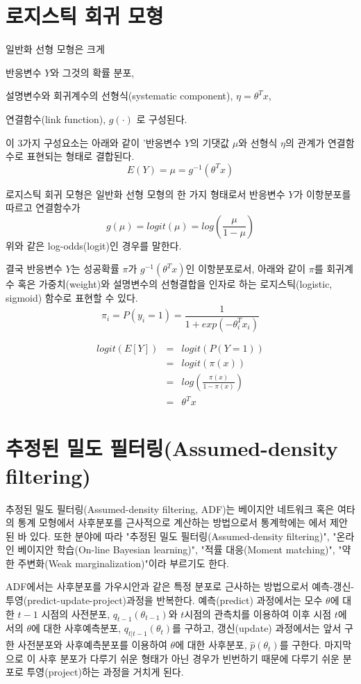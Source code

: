 \documentclass[oneside,b5paper,11pt]{book} %
\begin{document}
\section{로지스틱 회귀 모형}

일반화 선형 모형은 크게 
\begin{inparaenum}[i)]
\item 반응변수 $Y$와 그것의 확률 분포,\quad
\item 설명변수와 회귀계수의 선형식(systematic component), $\eta = \theta^T x$, \quad
\item 연결함수(link function), $g(\cdot)$ 로 구성된다.
\end{inparaenum} 이 3가지 구성요소는 아래와 같이 '반응변수 $Y$의 기댓값 $\mu$와 선형식 $\eta$의 관계가 연결함수로 표현되는 형태로 결합된다.\citep{Agresti1996}
$$E(Y) = \mu = g^{-1}(\theta^T x)$$

 로지스틱 회귀 모형은 일반화 선형 모형의 한 가지 형태로서 반응변수 $Y$가 이항분포를 따르고 연결함수가 
$$
g(\mu) = logit(\mu) =log \left(\frac{\mu}{1-\mu}\right)
$$
위와 같은 log-odds(logit)인 경우를 말한다.

결국 반응변수 $Y$는 성공확률 $\pi$가 $g^{-1}(\theta^T x)$인 이항분포로서, 아래와 같이 $\pi$를 회귀계수 혹은 가중치(weight)와 설명변수의 선형결합을 인자로 하는 로지스틱(logistic, sigmoid) 함수로 표현할 수 있다.
$$
\pi_i = P(y_i=1) = \frac{1}{1+exp(-\theta_i^T x_i)}
$$

\begin{eqnarray}
    {}logit(E[Y])  
  &=& logit(P(Y=1))  \\
  &=& logit(\pi(x))  \\  
  &=& log \left( \frac{\pi(x)}{1-\pi(x)}\right) \\
  &=& \theta^T x
\end{eqnarray}


\section{추정된 밀도 필터링(Assumed-density filtering)}
 추정된 밀도 필터링(Assumed-density filtering, ADF)는 베이지안 네트워크 혹은 여타의 통계 모형에서 사후분포를 근사적으로 계산하는 방법으로서 통계학에는 \citet{Lauritzen1992}에서 제안된 바 있다. 또한 분야에 따라 "추정된 밀도 필터링(Assumed-density filtering)", "온라인 베이지안 학습(On-line Bayesian learning)", "적률 대응(Moment matching)", "약한 주변화(Weak marginalization)"이라 부르기도 한다. \citep{Minka2013}

 ADF에서는 사후분포를 가우시안과 같은 특정 분포로 근사하는 방법으로서 예측-갱신-투영(predict-update-project)과정을 반복한다. 예측(predict) 과정에서는 모수 $\theta$에 대한 $t-1$ 시점의 사전분포, $q_{t-1}(\theta_{t-1})$와 $t$시점의 관측치를 이용하여 이후 시점 $t$에서의 $\theta$에 대한 사후예측분포, $q_{t|t-1}(\theta_{t})$를 구하고, 갱신(update) 과정에서는 앞서 구한 사전분포와 사후예측분포를 이용하여 $\theta$에 대한 사후분포, $\hat{p}(\theta_t)$를 구한다. 마지막으로 이 사후 분포가 다루기 쉬운 형태가 아닌 경우가 빈번하기 때문에 다루기 쉬운 분포로 투영(project)하는 과정을 거치게 된다.
\end{document}
